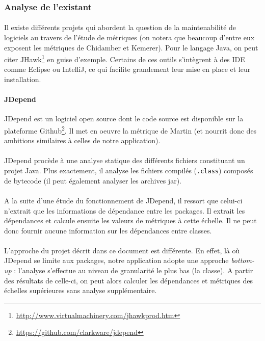\documentclass{scrartcl}
\begin{document}
\subsubsection{Analyse de l'existant}
    \paragraph{}Il existe différents projets qui abordent la question de la maintenabilité de logiciels au travers de l'étude de métriques (on notera que beaucoup d'entre eux exposent les métriques de Chidamber et Kemerer\cite{ChidamberKemerer:1994}). Pour le langage Java, on peut citer JHawk\footnote{\url{http://www.virtualmachinery.com/jhawkprod.htm}} en guise d'exemple. Certains de ces outils s'intègrent à des IDE comme Eclipse ou IntelliJ, ce qui facilite grandement leur mise en place et leur installation.
    
    \paragraph{JDepend}JDepend est un logiciel open source dont le code source est disponible sur la plateforme Github\footnote{\url{https://github.com/clarkware/jdepend}}. Il met en oeuvre la métrique de Martin (et nourrit donc des ambitions similaires à celles de notre application).

    \paragraph{}JDepend procède à une analyse statique des différents fichiers constituant un projet Java. Plus exactement, il analyse les fichiers compilés (\texttt{.class}) composés de bytecode (il peut également analyser les archives jar).
    
    \paragraph{}A la suite d'une étude du fonctionnement de JDepend, il ressort que celui-ci n'extrait que les informations de dépendance entre les packages. Il extrait les dépendances et calcule ensuite les valeurs de métriques à cette échelle. Il ne peut donc fournir aucune information sur les dépendances entre classes. 
    
    \paragraph{}L'approche du projet décrit dans ce document est différente. En effet, là où JDepend se limite aux packages, notre application adopte une approche \textit{bottom-up} : l'analyse s'effectue au niveau de granularité le plus bas (la classe). A partir des résultats de celle-ci, on peut alors calculer les dépendances et métriques des échelles supérieures sans analyse supplémentaire.
    
\end{document}

